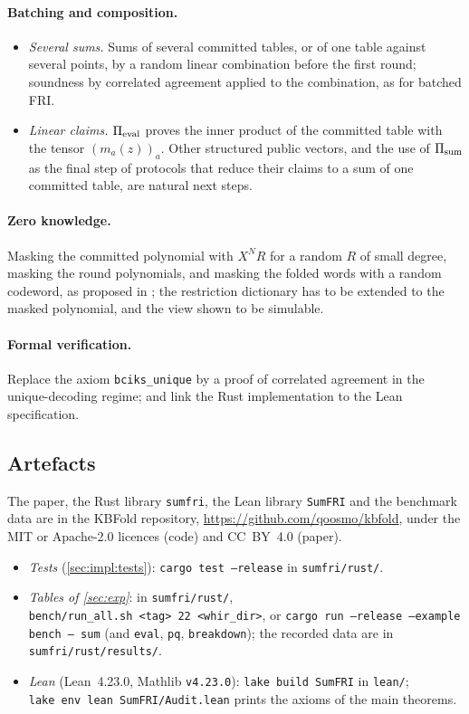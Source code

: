 \paragraph{Batching and composition.}
\begin{itemize}
  \item \emph{Several sums.} Sums of several committed tables, or of one table against several points, by a random linear combination before the first round; soundness by correlated agreement applied to the combination, as for batched FRI.
  \item \emph{Linear claims.} $\Pi_{\mathrm{eval}}$ proves the inner product of the committed table with the tensor $(m_a(z))_a$. Other structured public vectors, and the use of $\Pi_{\mathrm{sum}}$ as the final step of protocols that reduce their claims to a sum of one committed table, are natural next steps.
\end{itemize}

\paragraph{Zero knowledge.}
Masking the committed polynomial with $X^N R$ for a random $R$ of small degree, masking the round polynomials, and masking the folded words with a random codeword, as proposed in ; the restriction dictionary has to be extended to the masked polynomial, and the view shown to be simulable.

\paragraph{Formal verification.}
Replace the axiom \texttt{bciks\_unique} by a proof of correlated agreement in the unique-decoding regime; and link the Rust implementation to the Lean specification.

\subsection{Artefacts}\label{sec:concl:artefacts}
The paper, the Rust library \texttt{sumfri}, the Lean library \texttt{SumFRI} and the benchmark data are in the KBFold repository, \url{https://github.com/qoosmo/kbfold}, under the MIT or Apache-2.0 licences (code) and CC~BY~4.0 (paper).
\begin{itemize}
  \item \emph{Tests} (\cref{sec:impl:tests}): \texttt{cargo test --release} in \texttt{sumfri/rust/}.
  \item \emph{Tables of \cref{sec:exp}}: in \texttt{sumfri/rust/},\\ \texttt{bench/run\_all.sh <tag> 22 <whir\_dir>}, or \texttt{cargo run --release --example bench -- sum} (and \texttt{eval}, \texttt{pq}, \texttt{breakdown}); the recorded data are in \texttt{sumfri/rust/results/}.
  \item \emph{Lean} (Lean~4.23.0, Mathlib \texttt{v4.23.0}): \texttt{lake build SumFRI} in \texttt{lean/};\\ \texttt{lake env lean SumFRI/Audit.lean} prints the axioms of the main theorems.
\end{itemize}
